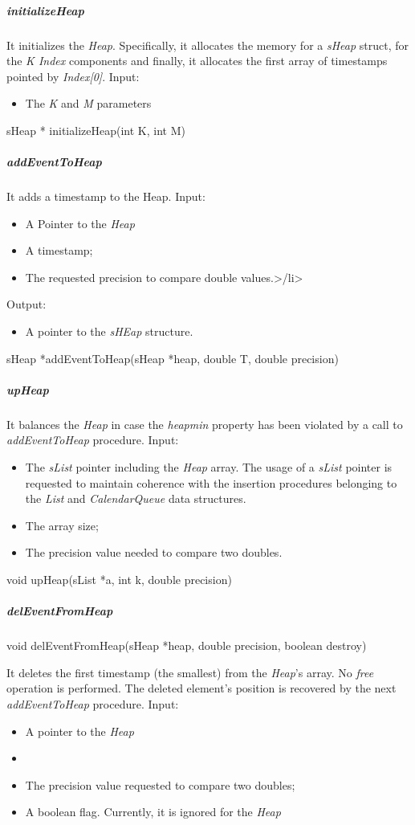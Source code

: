\subparagraph{initializeHeap}
It initializes the \textit{Heap}. Specifically, it allocates the memory for a \textit{sHeap} struct,
for the \textit{K Index} components and finally, it allocates the first array of timestamps pointed by \textit{Index[0]}.
Input:
\begin{itemize}
\item The \textit{K} and \textit{M} parameters
\end{itemize}
sHeap * initializeHeap(int K, int M)

\subparagraph{addEventToHeap}

It adds a timestamp to the Heap.
Input:
\begin{itemize}
\item A Pointer to the \textit{Heap}
\item A timestamp;
\item The requested precision to compare double values.>/li>
\end{itemize}
Output:
\begin{itemize}
\item A pointer to the \textit{sHEap} structure.
\end{itemize}
sHeap *addEventToHeap(sHeap *heap, double T, double precision)

\subparagraph{upHeap}
It balances the \textit{Heap} in case the \textit{heapmin} property has been violated by a call to \textit{addEventToHeap} procedure.
Input:
\begin{itemize}
\item The \textit{sList} pointer including the \textit{Heap} array. The usage of a \textit{sList} pointer  is requested to maintain coherence with
the insertion procedures belonging to the \textit{List} and \textit{CalendarQueue} data structures.
\item The array size;
\item The precision value needed to compare two doubles.
\end{itemize}
void upHeap(sList *a, int k, double precision)


\subparagraph{delEventFromHeap}
void delEventFromHeap(sHeap *heap, double precision, boolean destroy)

It deletes the first timestamp (the smallest) from the \textit{Heap}'s array. 
No \textit{free} operation is performed. The deleted element's position is recovered by the next \textit{addEventToHeap} procedure.
Input:
\begin{itemize}
\item A pointer to the \textit{Heap}\item 
\item The precision value requested to compare two doubles;
\item A boolean flag. Currently, it is ignored for the \textit{Heap}
\end{itemize}

